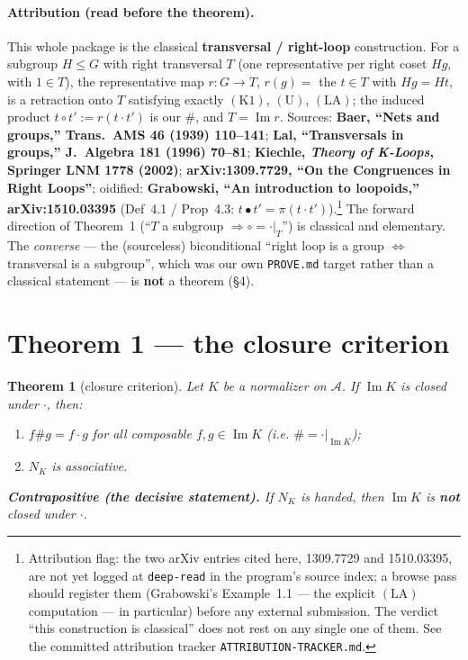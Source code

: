 \documentclass[11pt]{article}
\theoremstyle{plain}
\newtheorem{theorem}{Theorem}
\theoremstyle{definition}
\theoremstyle{remark}
\newcommand{\Acat}{\mathcal{A}}
\renewcommand{\Im}{\operatorname{Im}}
\newcommand{\NK}{N_K}
\begin{document}
\paragraph{Attribution (read before the theorem).} This whole package is the classical
\textbf{transversal / right-loop} construction. For a subgroup $H \le G$ with right transversal $T$
(one representative per right coset $Hg$, with $1 \in T$), the representative map $r : G \to T$,
$r(g) =$ the $t \in T$ with $Hg = Ht$, is a retraction onto $T$ satisfying exactly $(\mathrm{K1})$,
$(\mathrm{U})$, $(\mathrm{LA})$; the induced product $t \circ t' := r(t\cdot t')$ is our $\#$, and
$T = \Im r$. Sources: \textbf{Baer, ``Nets and groups,'' Trans.\ AMS 46 (1939) 110--141};
\textbf{Lal, ``Transversals in groups,'' J.\ Algebra 181 (1996) 70--81};
\textbf{Kiechle, \emph{Theory of K-Loops}, Springer LNM 1778 (2002)}; \textbf{arXiv:1309.7729, ``On
the Congruences in Right Loops''}; oidified: \textbf{Grabowski, ``An introduction to loopoids,''
arXiv:1510.03395} (Def~4.1 / Prop~4.3: $t\bullet t' = \pi(t\cdot t')$).\footnote{Attribution flag:
the two arXiv entries cited here, 1309.7729 and 1510.03395, are not yet logged at \texttt{deep-read}
in the program's source index; a browse pass should register them (Grabowski's Example~1.1 --- the
explicit $(\mathrm{LA})$ computation --- in particular) before any external submission. The verdict ``this
construction is classical'' does not rest on any single one of them. See the committed attribution
tracker \texttt{ATTRIBUTION-TRACKER.md}.} The forward direction of
Theorem~1 (``$T$ a subgroup $\Rightarrow \circ = \cdot|_T$'') is classical and elementary. The
\emph{converse} --- the (sourceless) biconditional ``right loop is a group $\iff$ transversal is a
subgroup'', which was our own \texttt{PROVE.md} target rather than a classical statement --- is
\textbf{not} a theorem (\S4).

\section{Theorem 1 --- the closure criterion}

\begin{theorem}[closure criterion]
Let $K$ be a normalizer on $\Acat$. If $\Im K$ is closed under $\cdot$, then:
\begin{enumerate}[label=(\arabic*),leftmargin=2.2em]
\item $f \# g = f\cdot g$ for all composable $f, g \in \Im K$ (i.e. $\# = \cdot|_{\Im K}$);
\item $\NK$ is associative.
\end{enumerate}
\noindent\textbf{Contrapositive (the decisive statement).} If $\NK$ is handed, then $\Im K$ is
\textbf{not} closed under $\cdot$.
\end{theorem}
\end{document}
